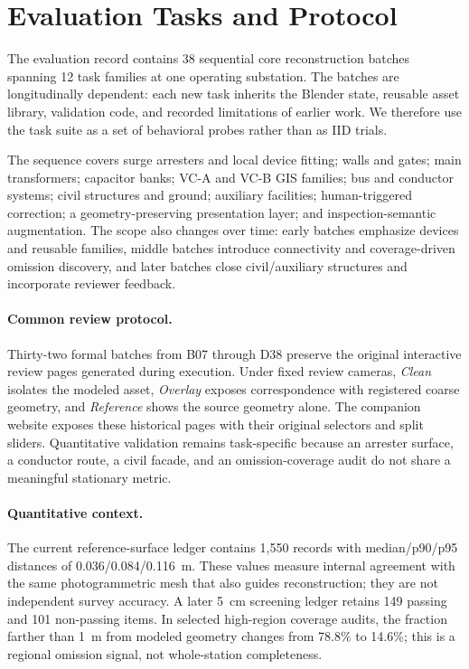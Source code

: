 \documentclass[10pt]{article}
\begin{document}
\section{Evaluation Tasks and Protocol}
The evaluation record contains 38 sequential core reconstruction batches spanning 12 task families at one operating substation. The batches are longitudinally dependent: each new task inherits the Blender state, reusable asset library, validation code, and recorded limitations of earlier work. We therefore use the task suite as a set of behavioral probes rather than as IID trials.

The sequence covers surge arresters and local device fitting; walls and gates; main transformers; capacitor banks; VC-A and VC-B GIS families; bus and conductor systems; civil structures and ground; auxiliary facilities; human-triggered correction; a geometry-preserving presentation layer; and inspection-semantic augmentation. The scope also changes over time: early batches emphasize devices and reusable families, middle batches introduce connectivity and coverage-driven omission discovery, and later batches close civil/auxiliary structures and incorporate reviewer feedback.

\paragraph{Common review protocol.} Thirty-two formal batches from B07 through D38 preserve the original interactive review pages generated during execution. Under fixed review cameras, \emph{Clean} isolates the modeled asset, \emph{Overlay} exposes correspondence with registered coarse geometry, and \emph{Reference} shows the source geometry alone. The companion website exposes these historical pages with their original selectors and split sliders. Quantitative validation remains task-specific because an arrester surface, a conductor route, a civil facade, and an omission-coverage audit do not share a meaningful stationary metric.

\paragraph{Quantitative context.} The current reference-surface ledger contains 1,550 records with median/p90/p95 distances of 0.036/0.084/0.116~m. These values measure internal agreement with the same photogrammetric mesh that also guides reconstruction; they are not independent survey accuracy. A later 5~cm screening ledger retains 149 passing and 101 non-passing items. In selected high-region coverage audits, the fraction farther than 1~m from modeled geometry changes from 78.8\% to 14.6\%; this is a regional omission signal, not whole-station completeness.
\end{document}
